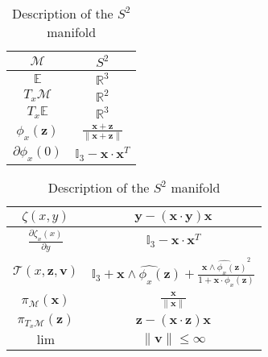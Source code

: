 \begin{table} [H]
\caption{Description of the $S^2$ manifold}
\centering
\begin{tabular}{cc}
  \toprule
  $\mathcal{M}$ & $S^2$ \\
  \midrule
  $\mathbb{E}$ & $\mathbb{R}^{3}$ \\
  \midrule
  $T_x\mathcal{M}$ & $\mathbb{R}^2$ \\
  \midrule
  $T_x\mathbb{E}$ & $\mathbb{R}^3$ \\
  \midrule
  $\phi_x(\mathbf{z})$ & $\frac{\mathbf{x}+\mathbf{z}}{\|\mathbf{x}+\mathbf{z}\|}$ \\
  \midrule
  $\partial \phi_x(0)$ & $\mathbb{I}_3 - \mathbf{x}\cdot\mathbf{x}^T$ \\
  \bottomrule
\end{tabular}
\quad
\begin{tabular}{cc}
  \toprule
  $\zeta(x,y)$ & $\mathbf{y} - (\mathbf{x} \cdot \mathbf{y}) \mathbf{x}$ \\
  \midrule
  $\frac{\partial \zeta_x(x)}{\partial y}$ & $\mathbb{I}_3 -\mathbf{x}\cdot\mathbf{x}^T$ \\
  \midrule
  $\mathcal{T}(x,\mathbf{z}, \mathbf{v})$ & $\mathbb{I}_3 + \widehat{\mathbf{x} \wedge \phi_x(\mathbf{z})} + \frac{{\widehat{\mathbf{x} \wedge \phi_x(\mathbf{z})}}^2}{1+\mathbf{x}\cdot\phi_x(\mathbf{z})}$ \\
  \midrule
  $\pi_\mathcal{M}(\mathbf{x})$ & $\frac{\mathbf{x}}{\|\mathbf{x}\|}$ \\
  \midrule
  $\pi_{T_x\mathcal{M}}(\mathbf{z})$ & $\mathbf{z} - (\mathbf{x} \cdot \mathbf{z}) \mathbf{x}$ \\
  \midrule
  $\lim$ & $\|\mathbf{v}\| \leq \infty$ \\
  \bottomrule
\end{tabular}
\end{table}

